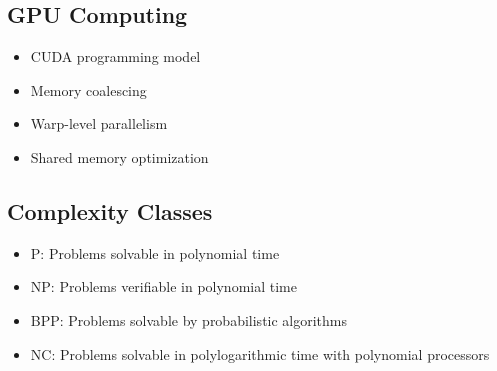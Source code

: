 \subsection{GPU Computing}
\begin{itemize}
    \item CUDA programming model
    \item Memory coalescing
    \item Warp-level parallelism
    \item Shared memory optimization
\end{itemize}

\subsection{Complexity Classes}
\begin{itemize}
    \item P: Problems solvable in polynomial time
    \item NP: Problems verifiable in polynomial time
    \item BPP: Problems solvable by probabilistic algorithms
    \item NC: Problems solvable in polylogarithmic time with polynomial processors
\end{itemize}